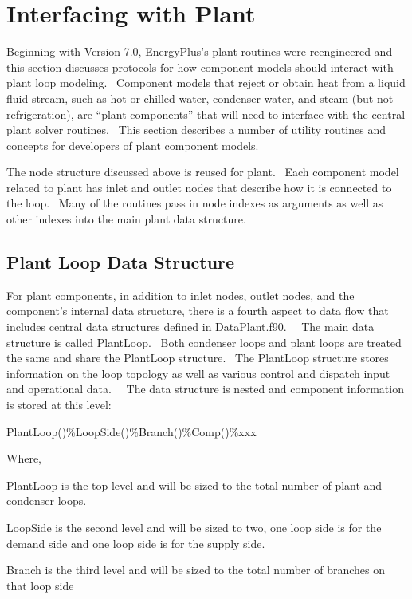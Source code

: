 \section{Interfacing with Plant}\label{interfacing-with-plant}

Beginning with Version 7.0, EnergyPlus's plant routines were reengineered and this section discusses protocols for how component models should interact with plant loop modeling.~ Component models that reject or obtain heat from a liquid fluid stream, such as hot or chilled water, condenser water, and steam (but not refrigeration), are ``plant components'' that will need to interface with the central plant solver routines.~ This section describes a number of utility routines and concepts for developers of plant component models.

The node structure discussed above is reused for plant.~ Each component model related to plant has inlet and outlet nodes that describe how it is connected to the loop.~ Many of the routines pass in node indexes as arguments as well as other indexes into the main plant data structure.

\subsection{Plant Loop Data Structure}\label{plant-loop-data-structure}

For plant components, in addition to inlet nodes, outlet nodes, and the component's internal data structure, there is a fourth aspect to data flow that includes central data structures defined in DataPlant.f90.~~ The main data structure is called PlantLoop.~ Both condenser loops and plant loops are treated the same and share the PlantLoop structure.~ The PlantLoop structure stores information on the loop topology as well as various control and dispatch input and operational data.~~ The data structure is nested and component information is stored at this level:

PlantLoop()\%LoopSide()\%Branch()\%Comp()\%xxx

Where,

PlantLoop is the top level and will be sized to the total number of plant and condenser loops.

LoopSide is the second level and will be sized to two, one loop side is for the demand side and one loop side is for the supply side.

Branch is the third level and will be sized to the total number of branches on that loop side

